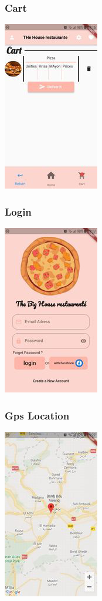 \documentclass{article}
\begin{document}
\subsubsection{Cart}
\includegraphics[scale=1]{./out/MobileApp/Ui/4.png}\\

\subsubsection{Login}
\includegraphics[scale=1]{./out/MobileApp/Ui/5.png}\\

\subsubsection{Gps Location}
\includegraphics[scale=1]{./out/MobileApp/Ui/7.png}\\
\end{document}
